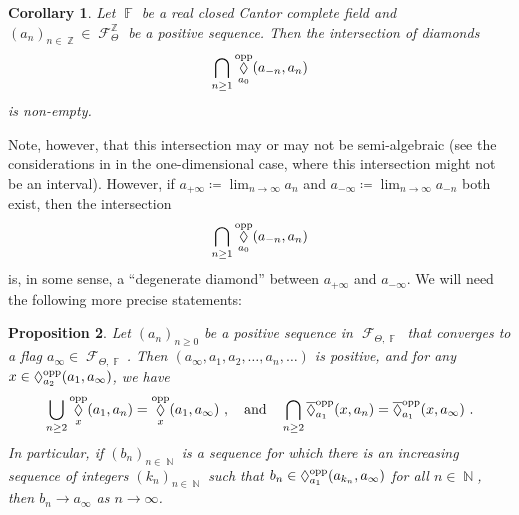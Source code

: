 \documentclass{amsart}
\theoremstyle{plain}
\newtheorem{proposition}{Proposition}[section]
\newtheorem{corollary}[proposition]{Corollary}
\theoremstyle{definition}
\DeclareMathOperator{\Diam}{\lozenge}
\DeclareMathOperator{\Fc}{\mathcal{F}}
\DeclareMathOperator{\Fb}{{\mathbb{F}}}
\DeclareMathOperator{\Nb}{{\mathbb{N}}}
\DeclareMathOperator{\Zb}{\mathbb{Z}}
\newcommand{\opp}{\textnormal{opp}}
\newcommand{\1}{\mathbf{1}}
\begin{document}
\begin{corollary}\label{corollary: diamond nonempty intersection over cantor complete fields}
    Let $\Fb$ be a real closed Cantor complete field and $(a_n)_{n\in \Zb}\in \Fc_\Theta^{\Zb}$ be a positive sequence. Then the intersection of diamonds \[\bigcap_{n\geq 1} \Diam_{a_0}^\opp(a_{-n},a_n)\] is non-empty.
\end{corollary}

Note, however, that this intersection may or may not be semi-algebraic (see the considerations in  in the one-dimensional case, where this intersection might not be an interval). However, if $a_{+\infty}\coloneqq\lim_{n\to\infty}a_n$ and $a_{-\infty}\coloneqq \lim_{n\to\infty}a_{-n}$ both exist, then the intersection
\[\bigcap_{n\geq 1} \Diam_{a_0}^\opp (a_{-n}, a_n)\]
 is, in some sense, a ``degenerate diamond'' between $a_{+\infty}$ and $a_{-\infty}$. We will need the following more precise statements:

\begin{proposition}
\label{onesided squeeze}
Let $(a_n)_{n\geq 0}$ be a positive sequence in $\Fc_{\Theta,\Fb}$ that converges to a flag $a_\infty \in \Fc_{\Theta,\Fb}$. Then $(a_\infty, a_1, a_2,\ldots , a_n, \ldots )$ is positive, and for any $x\in \Diam_{a_2}^\opp(a_1, a_\infty)$, we have \[\bigcup_{n\geq 2} \Diam_x^\opp(a_1,a_n) = \Diam_x^\opp(a_1,a_\infty)~, \quad\text{and}\quad\bigcap_{n\geq 2} \overline{\Diam}_{a_1}^\opp(x,a_n) = \overline{\Diam}_{a_1}^\opp(x,a_\infty)~.\]
In particular, if $(b_n)_{n\in\Nb}$ is a sequence for which there is an increasing sequence of integers $(k_n)_{n\in\Nb}$ such that $b_n\in \Diam_{a_1}^{\rm opp}(a_{k_n},a_\infty)$ for all $n\in\Nb$, then $b_n\to a_\infty$ as $n\to\infty$.
\end{proposition}
\end{document}
